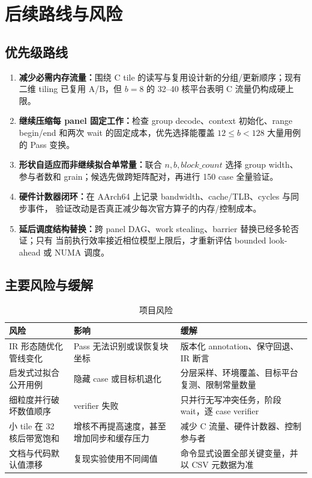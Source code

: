 \documentclass[UTF8,a4paper,openany,11pt,fontset=fandol]{ctexrep}
\renewcommand{\arraystretch}{1.25}
\begin{document}
\chapter{后续路线与风险}

\section{优先级路线}

\begin{enumerate}
  \item \textbf{减少必需内存流量：}围绕 C tile 的读写与复用设计新的分组/更新顺序；现有二维
        tiling 已复用 A/B，但 \(b=8\) 的 32--40 核平台表明 C 流量仍构成硬上限。
  \item \textbf{继续压缩每 panel 固定工作：}检查 group decode、context 初始化、range begin/end
        和两次 wait 的固定成本，优先选择能覆盖 \(12\le b<128\) 大量用例的 Pass 变换。
  \item \textbf{形状自适应而非继续拟合单常量：}联合 \(n,b,block\_count\) 选择 group width、
        参与者数和 grain；候选先做跨矩阵配对，再进行 150 case 全量验证。
  \item \textbf{硬件计数器闭环：}在 AArch64 上记录 bandwidth、cache/TLB、cycles 与同步事件，
        验证改动是否真正减少每次官方算子的内存/控制成本。
  \item \textbf{延后调度结构替换：}跨 panel DAG、work stealing、barrier 替换已经多轮否证；只有
        当前执行效率接近相位模型上限后，才重新评估 bounded look-ahead 或 NUMA 调度。
\end{enumerate}

\section{主要风险与缓解}

\begin{table}[H]
  \centering
  \caption{项目风险}
  \small
  \renewcommand{\arraystretch}{1.12}
  \begin{tabularx}{\textwidth}{L{3.2cm}Y Y}
    \toprule
    风险 & 影响 & 缓解 \\
    \midrule
    IR 形态随优化管线变化 & Pass 无法识别或误恢复块坐标 & 版本化 annotation、保守回退、IR 断言 \\
    启发式过拟合公开用例 & 隐藏 case 或目标机退化 & 分层采样、环境覆盖、目标平台复测、限制常量数量 \\
    细粒度并行破坏数值顺序 & verifier 失败 & 只并行无写冲突任务，阶段 wait，逐 case verifier \\
    小 tile 在 32 核后带宽饱和 & 增核不再提高速度，甚至增加同步和缓存压力 & 减少 C 流量、硬件计数器、控制参与者 \\
    文档与代码默认值漂移 & 复现实验使用不同阈值 & 命令显式设置全部关键变量，并以 CSV 元数据为准 \\
    \bottomrule
  \end{tabularx}
\end{table}
\end{document}
